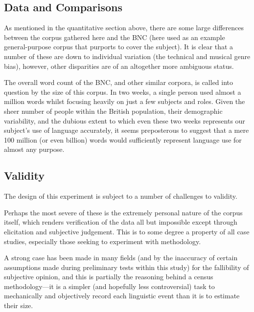 \subsection{Data and Comparisons}

As mentioned in the quantitative section above, there are some large differences between the corpus gathered here and the BNC (here used as an example general-purpose corpus that purports to cover the subject).  It is clear that a number of these are down to individual variation (the technical and musical genre bias), however, other disparities are of an altogether more ambiguous status.

The overall word count of the BNC, and other similar corpora, is called into question by the size of this corpus.  In two weeks, a single person used almost a million words whilst focusing heavily on just a few subjects and roles.  Given the sheer number of people within the British population, their demographic variability, and the dubious extent to which even these two weeks represents our subject's use of language accurately, it seems preposterous to suggest that a mere 100 million (or even billion) words would sufficiently represent language use for almost any purpose.











\subsection{Validity}
The design of this experiment is subject to a number of challenges to validity.

Perhaps the most severe of these is the extremely personal nature of the corpus itself, which renders verification of the data all but impossible except through elicitation and subjective judgement.  This is to some degree a property of all case studies, especially those seeking to experiment with methodology.

A strong case has been made in many fields (and by the inaccuracy of certain assumptions made during preliminary tests within this study) for the fallibility of subjective opinion, and this is partially the reasoning behind a census methodology---it is a simpler (and hopefully less controversial) task to mechanically and objectively record each linguistic event than it is to estimate their size.

